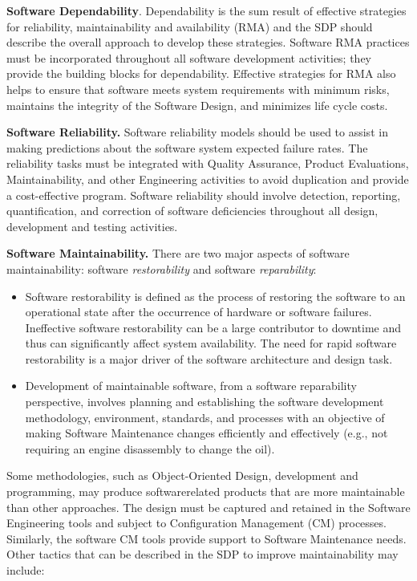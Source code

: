 \textbf{Software Dependability}. Dependability is the sum
result of effective strategies for reliability, maintainability
and availability (RMA) and the SDP should describe the
overall approach to develop these strategies. Software RMA
practices must be incorporated throughout all software
development activities; they provide the building blocks for
dependability. Effective strategies for RMA also helps to
ensure that software meets system requirements with minimum risks, maintains the integrity of the Software Design,
and minimizes life cycle costs.

\textbf{Software Reliability.} Software reliability models should
be used to assist in making predictions about the software
system expected failure rates. The reliability tasks must be
integrated with Quality Assurance, Product Evaluations,
Maintainability, and other Engineering activities to avoid
duplication and provide a cost-effective program. Software
reliability should involve detection, reporting, quantification, and correction of software deficiencies throughout all
design, development and testing activities.

\textbf{Software Maintainability.} There are two major aspects
of software maintainability: software \textit{restorability} and software \textit{reparability}:

\begin{itemize}
	\renewcommand{\labelitemi}{\scriptsize$\blacksquare$}
	\item Software restorability is defined as the process of
	restoring the software to an operational state after the
	occurrence of hardware or software failures. Ineffective
	software restorability can be a large contributor to downtime and thus can significantly affect system availability.
	The need for rapid software restorability is a major driver
	of the software architecture and design task.
	\item Development of maintainable software, from a software reparability perspective, involves planning and
	establishing the software development methodology,
	environment, standards, and processes with an objective of making Software Maintenance changes efficiently and effectively (e.g., not requiring an engine
	disassembly to change the oil).

\end{itemize}

Some methodologies, such as Object-Oriented Design,
development and programming, may produce softwarerelated products that are more maintainable than other
approaches. The design must be captured and retained in
the Software Engineering tools and subject to Configuration
Management (CM) processes. Similarly, the software CM
tools provide support to Software Maintenance needs. Other
tactics that can be described in the SDP to improve maintainability may include:

